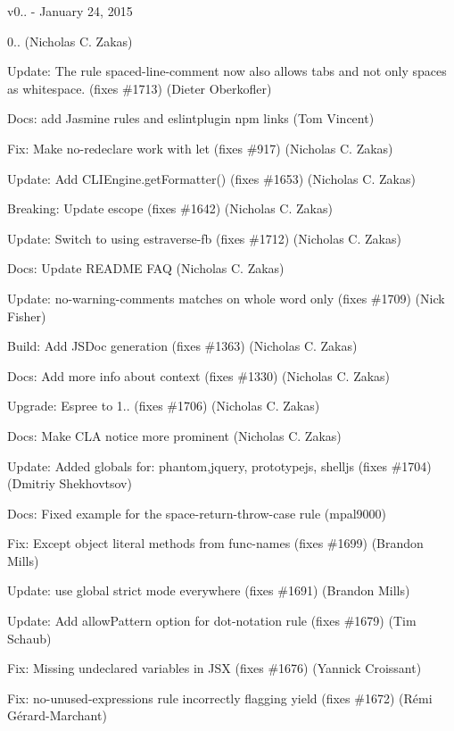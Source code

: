 v0.. -\/ January 24, 2015


\begin{DoxyItemize}
\item 0.. (Nicholas C. Zakas)
\item Update\+: The rule spaced-\/line-\/comment now also allows tabs and not only spaces as whitespace. (fixes \#1713) (Dieter Oberkofler)
\item Docs\+: add Jasmine rules and eslintplugin npm links (Tom Vincent)
\item Fix\+: Make no-\/redeclare work with let (fixes \#917) (Nicholas C. Zakas)
\item Update\+: Add C\+L\+I\+Engine.\+get\+Formatter() (fixes \#1653) (Nicholas C. Zakas)
\item Breaking\+: Update escope (fixes \#1642) (Nicholas C. Zakas)
\item Update\+: Switch to using estraverse-\/fb (fixes \#1712) (Nicholas C. Zakas)
\item Docs\+: Update R\+E\+A\+D\+ME F\+AQ (Nicholas C. Zakas)
\item Update\+: no-\/warning-\/comments matches on whole word only (fixes \#1709) (Nick Fisher)
\item Build\+: Add J\+S\+Doc generation (fixes \#1363) (Nicholas C. Zakas)
\item Docs\+: Add more info about context (fixes \#1330) (Nicholas C. Zakas)
\item Upgrade\+: Espree to 1.. (fixes \#1706) (Nicholas C. Zakas)
\item Docs\+: Make C\+LA notice more prominent (Nicholas C. Zakas)
\item Update\+: Added globals for\+: phantom,jquery, prototypejs, shelljs (fixes \#1704) (Dmitriy Shekhovtsov)
\item Docs\+: Fixed example for the space-\/return-\/throw-\/case rule (mpal9000)
\item Fix\+: Except object literal methods from func-\/names (fixes \#1699) (Brandon Mills)
\item Update\+: use global strict mode everywhere (fixes \#1691) (Brandon Mills)
\item Update\+: Add allow\+Pattern option for dot-\/notation rule (fixes \#1679) (Tim Schaub)
\item Fix\+: Missing undeclared variables in J\+SX (fixes \#1676) (Yannick Croissant)
\item Fix\+: no-\/unused-\/expressions rule incorrectly flagging yield (fixes \#1672) (Rémi Gérard-\/\+Marchant)

\end{DoxyItemize}
